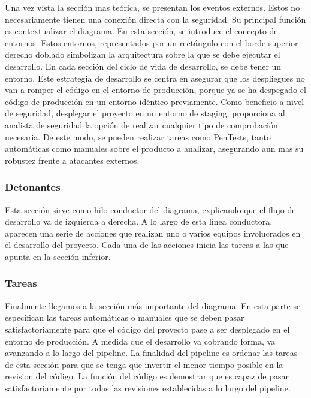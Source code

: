 \documentclass[12pt]{report} %
\begin{document}
Una vez vista la sección mas teórica, se presentan los eventos externos. 
Estos no necesariamente tienen una conexión directa con la seguridad.
Su principal función es contextualizar el diagrama.
En esta sección, se introduce el concepto de entornos.
Estos entornos, representados por un rectángulo con el borde superior derecho
doblado simbolizan la arquitectura sobre la que se debe ejecutar el desarrollo.
En cada sección del ciclo de vida de desarrollo, se debe tener un entorno.
Este estrategia de desarrollo se centra en asegurar que los despliegues no van a
romper el código en el entorno de producción, porque ya se ha despegado el
código de producción en un entorno idéntico previamente.
Como beneficio a nivel de seguridad, desplegar el proyecto en un entorno de
staging, proporciona al analista de seguridad la opción de realizar cualquier
tipo de comprobación necesaria. 
De este modo, se pueden realizar tareas como \gls{PenTest}s, tanto automáticas
como manuales sobre el producto a analizar, asegurando aun mas su robustez frente
a atacantes externos.

\subsubsection{Detonantes}
 
Esta sección sirve como hilo conductor del diagrama, explicando que el flujo de
desarrollo va de izquierda a derecha.
A lo largo de esta línea conductora, aparecen una serie de acciones que realizan
uno o varios equipos involucrados en el desarrollo del proyecto.
Cada una de las acciones inicia las tareas a las que apunta en la sección
inferior.

\subsubsection{Tareas}

Finalmente llegamos a la sección más importante del diagrama.
En esta parte se especifican las tareas automáticas o manuales que se deben
pasar satisfactoriamente para que el código del proyecto pase a ser desplegado
en el entorno de producción.
A medida que el desarrollo va cobrando forma, va avanzando a lo largo del
\gls{pipeline}.
La finalidad del pipeline es ordenar las tareas de esta sección para que se tenga
que invertir el menor tiempo posible en la revision del código.
La función del código es demostrar que es capaz de pasar satisfactoriamente por
todas las revisiones establecidas a lo largo del \gls{pipeline}.
 
\end{document}

